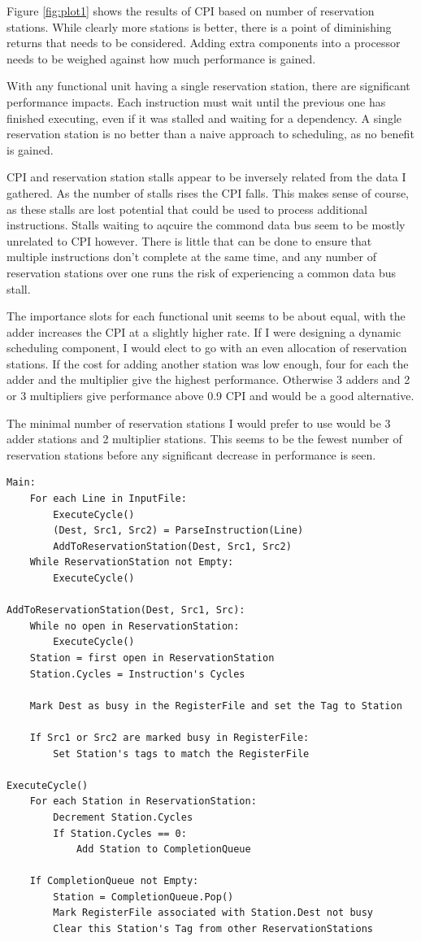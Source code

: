 \documentclass[twocolumn,letterpaper,10pt]{article}
\begin{document}
Figure \ref{fig:plot1} shows the results of CPI based on number of reservation stations. While clearly more stations is better, there is a point of diminishing returns that needs to be considered. Adding extra components into a processor needs to be weighed against how much performance is gained.

With any functional unit having a single reservation station, there are significant performance impacts. Each instruction must wait until the previous one has finished executing, even if it was stalled and waiting for a dependency. A single reservation station is no better than a naive approach to scheduling, as no benefit is gained.

CPI and reservation station stalls appear to be inversely related from the data I gathered. As the number of stalls rises the CPI falls. This makes sense of course, as these stalls are lost potential that could be used to process additional instructions. Stalls waiting to aqcuire the commond data bus seem to be mostly unrelated to CPI however. There is little that can be done to ensure that multiple instructions don't complete at the same time, and any number of reservation stations over one runs the risk of experiencing a common data bus stall.

The importance slots for each functional unit seems to be about equal, with the adder increases the CPI at a slightly higher rate. If I were designing a dynamic scheduling component, I would elect to go with an even allocation of reservation stations. If the cost for adding another station was low enough, four for each the adder and the multiplier give the highest performance. Otherwise 3 adders and 2 or 3 multipliers give performance above 0.9 CPI and would be a good alternative. 

The minimal number of reservation stations I would prefer to use would be 3 adder stations and 2 multiplier stations. This seems to be the fewest number of reservation stations before any significant decrease in performance is seen.

\clearpage

\begin{lstlisting}[]
Main:
	For each Line in InputFile:
		ExecuteCycle()
		(Dest, Src1, Src2) = ParseInstruction(Line)
		AddToReservationStation(Dest, Src1, Src2)
	While ReservationStation not Empty:
		ExecuteCycle()

AddToReservationStation(Dest, Src1, Src):
	While no open in ReservationStation:
		ExecuteCycle()
	Station = first open in ReservationStation
	Station.Cycles = Instruction's Cycles

	Mark Dest as busy in the RegisterFile and set the Tag to Station

	If Src1 or Src2 are marked busy in RegisterFile:
		Set Station's tags to match the RegisterFile

ExecuteCycle()
	For each Station in ReservationStation:
		Decrement Station.Cycles
		If Station.Cycles == 0:
			Add Station to CompletionQueue
	
	If CompletionQueue not Empty:
		Station = CompletionQueue.Pop()
		Mark RegisterFile associated with Station.Dest not busy
		Clear this Station's Tag from other ReservationStations
		
\end{lstlisting}
\end{document}
